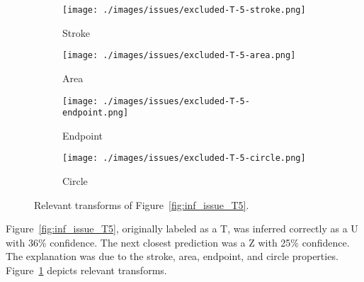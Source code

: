 \begin{figure}[H]
    \centering
    \begin{subfigure}{.20\columnwidth}
        \centering
        \texttt{[image: ./images/issues/excluded-T-5-stroke.png]}
        \caption{Stroke}
    \end{subfigure}%
    \begin{subfigure}{.20\columnwidth}
        \centering
        \texttt{[image: ./images/issues/excluded-T-5-area.png]}
        \caption{Area}
    \end{subfigure}%
    \begin{subfigure}{.20\columnwidth}
        \centering
        \texttt{[image: ./images/issues/excluded-T-5-endpoint.png]}
        \caption{Endpoint}
    \end{subfigure}%
    \begin{subfigure}{.20\columnwidth}
        \centering
        \texttt{[image: ./images/issues/excluded-T-5-circle.png]}
        \caption{Circle}
    \end{subfigure}%
    \caption{Relevant transforms of Figure~\ref{fig:inf_issue_T5}.}
    \label{fig:t5_trans}
\end{figure}

Figure~\ref{fig:inf_issue_T5}, originally labeled as a T, was inferred correctly as
a U with 36\% confidence. The next closest prediction was a Z with 25\%
confidence.  The explanation was due to the stroke, area,
endpoint, and circle properties. Figure~\ref{fig:t5_trans}
depicts relevant transforms.

